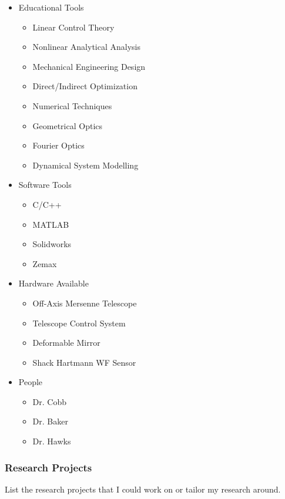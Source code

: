 \documentclass{article}
\begin{document}
\begin{itemize}

	\item Educational Tools
	\begin{itemize}
		\item Linear Control Theory
		\item Nonlinear Analytical Analysis
		\item Mechanical Engineering Design
		\item Direct/Indirect Optimization
		\item Numerical Techniques
		\item Geometrical Optics
		\item Fourier Optics
		\item Dynamical System Modelling
	\end{itemize}
	
	\item Software Tools
	\begin{itemize}
		\item C/C++
		\item MATLAB
		\item Solidworks
		\item Zemax
	\end{itemize}
	
	\item Hardware Available
	\begin{itemize}
		\item Off-Axis Mersenne Telescope
		\item Telescope Control System
		\item Deformable Mirror
		\item Shack Hartmann WF Sensor
	\end{itemize}
	
	\item{People}
	\begin{itemize}
		\item Dr. Cobb
		\item Dr. Baker
		\item Dr. Hawks
	\end{itemize}
	
\end{itemize}

\subsubsection{Research Projects}
List the research projects that I could work on or tailor my research around.
\end{document}
